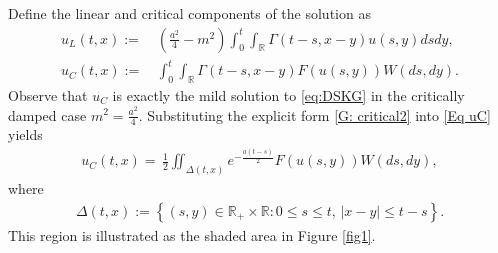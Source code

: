 \documentclass[11pt,reqno]{amsart}
\numberwithin{equation}{section}
\newcommand{\1}{{\bf 1}}
\newcommand{\2}{{\bf 2}}
\begin{document}
Define the linear and critical components of the solution as
    \begin{align}  
   u_L(t, x) := &\, \left(\frac{a^2}{4}-m^2\right) \int_0^t \int_{\mathbb R} \Gamma(t-s,x-y) u(s,y) dsdy, \label{Eq uL}\\
     u_C(t,x) :=&\,   \int_0^t \int_{\mathbb R} \Gamma(t-s, x-y) F(u(s, y)) W(ds, dy). \label{Eq uC} 
\end{align}
Observe that $u_C$ is   exactly  the   mild solution to \eqref{eq:DSKG}  in the critically damped case  $m^2 = \frac{a^2}{4}$.  Substituting  the explicit form \eqref{G: critical2}  into   \eqref{Eq uC} yields 
  \begin{equation}\label{eq solution uc}
\begin{split}
   u_C(t,x) =\, \frac{1}{2}\iint_{\Delta(t,x)} e^{-\frac{a(t-s)}{2}}F(u(s,y))W(ds,dy),
   \end{split}
\end{equation}
 where  
  \begin{align}\label{eq Delta tx}
\Delta(t, x):=\left\{(s,y)\in \mathbb R_+\times \mathbb R: 0\le s\le t, \, |x-y|\le t-s \right\}.
\end{align}
This  region is  illustrated as  the shaded area in Figure \ref{fig1}.
 
    
 
\end{document}
